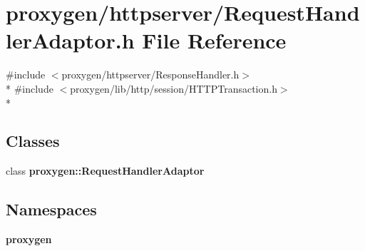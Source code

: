 \section{proxygen/httpserver/\+Request\+Handler\+Adaptor.h File Reference}
\label{RequestHandlerAdaptor_8h}
{\ttfamily \#include $<$proxygen/httpserver/\+Response\+Handler.\+h$>$}\\*
{\ttfamily \#include $<$proxygen/lib/http/session/\+H\+T\+T\+P\+Transaction.\+h$>$}\\*
\subsection*{Classes}
\begin{DoxyCompactItemize}
\item 
class {\bf proxygen\+::\+Request\+Handler\+Adaptor}
\end{DoxyCompactItemize}
\subsection*{Namespaces}
\begin{DoxyCompactItemize}
\item 
 {\bf proxygen}
\end{DoxyCompactItemize}
